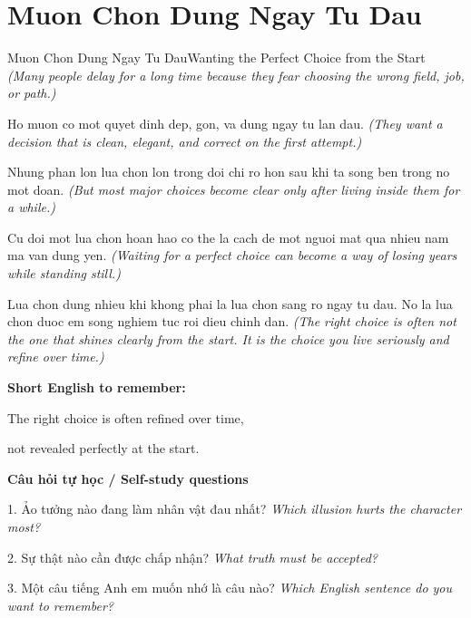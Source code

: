 \section{Muon Chon Dung Ngay Tu Dau}
\begin{truyen}{Muon Chon Dung Ngay Tu Dau}{Wanting the Perfect Choice from the Start}
\textit{(Many people delay for a long time because they fear choosing the wrong field, job, or path.)}

Ho muon co mot quyet dinh dep, gon, va dung ngay tu lan dau.
\textit{(They want a decision that is clean, elegant, and correct on the first attempt.)}

Nhung phan lon lua chon lon trong doi chi ro hon sau khi ta song ben trong no mot doan.
\textit{(But most major choices become clear only after living inside them for a while.)}

Cu doi mot lua chon hoan hao co the la cach de mot nguoi mat qua nhieu nam ma van dung yen.
\textit{(Waiting for a perfect choice can become a way of losing years while standing still.)}

\end{truyen}

\begin{baihoc}
Lua chon dung nhieu khi khong phai la lua chon sang ro ngay tu dau. No la lua chon duoc em song nghiem tuc roi dieu chinh dan.
\textit{(The right choice is often not the one that shines clearly from the start. It is the choice you live seriously and refine over time.)}
\end{baihoc}

\begin{ghinhoanh}
\textbf{Short English to remember:}

The right choice is often refined over time,

not revealed perfectly at the start.

\end{ghinhoanh}

\begin{tuhocnhanh}
\textbf{Câu hỏi tự học / Self-study questions}

1. Ảo tưởng nào đang làm nhân vật đau nhất? \textit{Which illusion hurts the character most?}

2. Sự thật nào cần được chấp nhận? \textit{What truth must be accepted?}

3. Một câu tiếng Anh em muốn nhớ là câu nào? \textit{Which English sentence do you want to remember?}
\end{tuhocnhanh}
\ngancach

